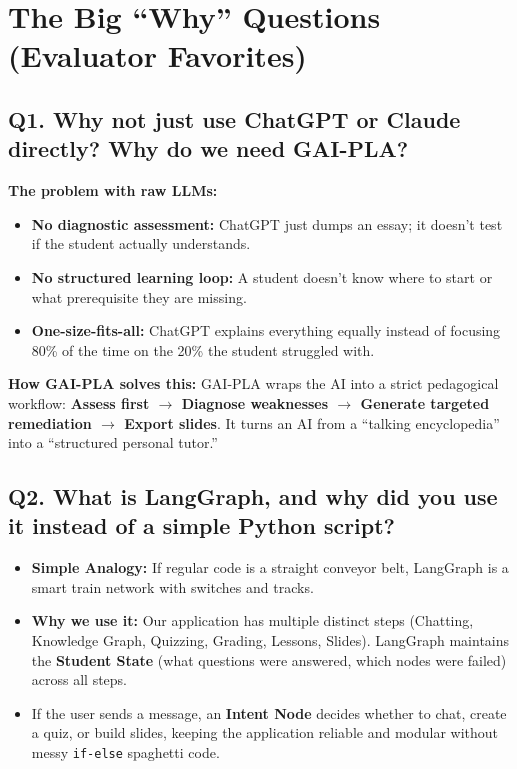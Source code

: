 \documentclass[11pt,a4paper]{article}
\begin{document}
\section{The Big ``Why'' Questions (Evaluator Favorites)}

\subsection*{Q1. Why not just use ChatGPT or Claude directly? Why do we need GAI-PLA?}
\begin{answerbox}
\textbf{The problem with raw LLMs:}
\begin{itemize}[noitemsep]
    \item \textbf{No diagnostic assessment:} ChatGPT just dumps an essay; it doesn't test if the student actually understands.
    \item \textbf{No structured learning loop:} A student doesn't know where to start or what prerequisite they are missing.
    \item \textbf{One-size-fits-all:} ChatGPT explains everything equally instead of focusing 80\% of the time on the 20\% the student struggled with.
\end{itemize}
\textbf{How GAI-PLA solves this:}
GAI-PLA wraps the AI into a strict pedagogical workflow: \textbf{Assess first $\to$ Diagnose weaknesses $\to$ Generate targeted remediation $\to$ Export slides}. It turns an AI from a ``talking encyclopedia'' into a ``structured personal tutor.''
\end{answerbox}

\subsection*{Q2. What is LangGraph, and why did you use it instead of a simple Python script?}
\begin{answerbox}
\begin{itemize}[noitemsep]
    \item \textbf{Simple Analogy:} If regular code is a straight conveyor belt, LangGraph is a smart train network with switches and tracks.
    \item \textbf{Why we use it:} Our application has multiple distinct steps (Chatting, Knowledge Graph, Quizzing, Grading, Lessons, Slides). LangGraph maintains the \textbf{Student State} (what questions were answered, which nodes were failed) across all steps.
    \item If the user sends a message, an \textbf{Intent Node} decides whether to chat, create a quiz, or build slides, keeping the application reliable and modular without messy \texttt{if-else} spaghetti code.
\end{itemize}
\end{answerbox}
\end{document}
